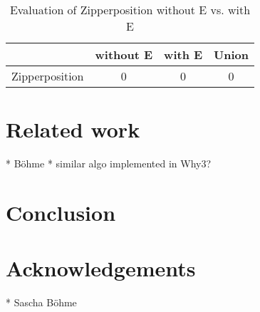 \documentclass[]{ceurart}
\begin{document}
\begin{table}[ht]
\caption{Evaluation of Zipperposition without E vs. with E}
\centering\begin{tabular}{@{}lccc@{}}
   \toprule
   & without E & with E & Union \\
   \midrule
   Zipperposition & 0 & 0 & 0 \\
   \bottomrule
\end{tabular}
\end{table}

\break

\section{Related work}
\label{sec:related-work}

  * Böhme
  * similar algo implemented in Why3?

\section{Conclusion}
\label{sec:conclusion}



\section*{Acknowledgements}

* Sascha Böhme


\end{document}
